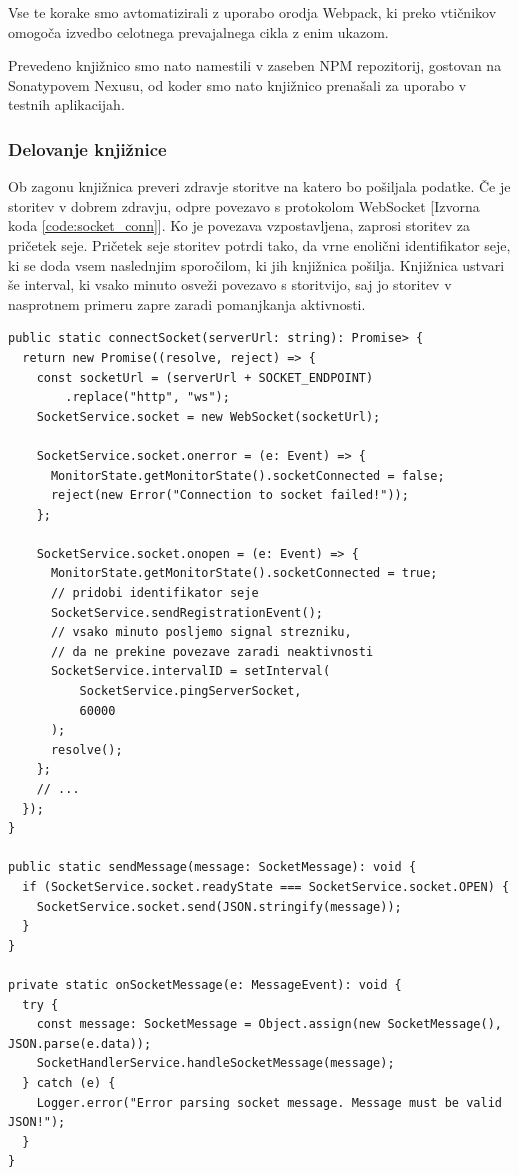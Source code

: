 \documentclass[a4paper, 12pt]{book}
\begin{document}
Vse te korake smo avtomatizirali z uporabo orodja Webpack, ki preko vtičnikov omogoča izvedbo celotnega prevajalnega cikla z enim ukazom. 

Prevedeno knjižnico smo nato namestili v zaseben NPM repozitorij, gostovan na Sonatypovem Nexusu, od koder smo nato knjižnico prenašali za uporabo v testnih aplikacijah.

\subsubsection{Delovanje knjižnice}

Ob zagonu knjižnica preveri zdravje storitve na katero bo pošiljala podatke. Če je storitev v dobrem zdravju, odpre povezavo s protokolom WebSocket [Izvorna koda \ref{code:socket_conn}]. Ko je povezava vzpostavljena, zaprosi storitev za pričetek seje. Pričetek seje storitev potrdi tako, da vrne enolični identifikator seje, ki se doda vsem naslednjim sporočilom, ki jih knjižnica pošilja.
Knjižnica ustvari še interval, ki vsako minuto osveži povezavo s storitvijo, saj jo storitev v nasprotnem primeru zapre zaradi pomanjkanja aktivnosti.

\begin{lstlisting}[label=code:socket_conn, caption=Odpiranje WebSocket povezave in metode za upravljanje WebSocket akcij]
public static connectSocket(serverUrl: string): Promise> {
  return new Promise((resolve, reject) => {
    const socketUrl = (serverUrl + SOCKET_ENDPOINT)
        .replace("http", "ws");
    SocketService.socket = new WebSocket(socketUrl);

    SocketService.socket.onerror = (e: Event) => {
      MonitorState.getMonitorState().socketConnected = false;
      reject(new Error("Connection to socket failed!"));
    };

    SocketService.socket.onopen = (e: Event) => {
      MonitorState.getMonitorState().socketConnected = true;
      // pridobi identifikator seje
      SocketService.sendRegistrationEvent();
      // vsako minuto posljemo signal strezniku,
      // da ne prekine povezave zaradi neaktivnosti
      SocketService.intervalID = setInterval(
          SocketService.pingServerSocket,
          60000
      );
      resolve();
    };
    // ... 
  });
}

public static sendMessage(message: SocketMessage): void {
  if (SocketService.socket.readyState === SocketService.socket.OPEN) {
    SocketService.socket.send(JSON.stringify(message));
  }
}

private static onSocketMessage(e: MessageEvent): void {
  try {
    const message: SocketMessage = Object.assign(new SocketMessage(), JSON.parse(e.data));
    SocketHandlerService.handleSocketMessage(message);
  } catch (e) {
    Logger.error("Error parsing socket message. Message must be valid JSON!");
  }
}
\end{lstlisting}
\end{document}
